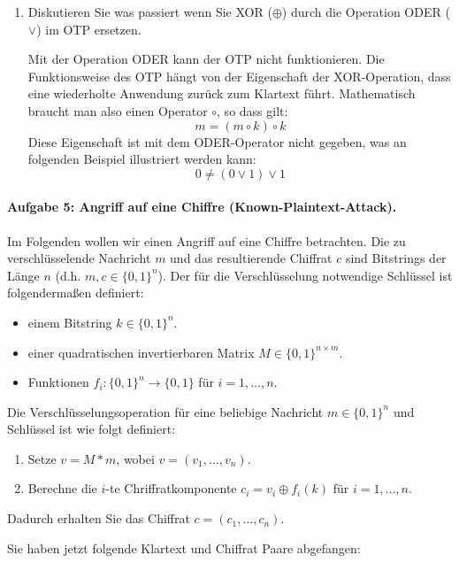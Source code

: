 \documentclass[
  ngerman,
  DIV=12
]{scrartcl}
\begin{document}
\begin{enumerate}[label=\alph*)]

\item Diskutieren Sie was passiert wenn Sie XOR ($\oplus$) durch die Operation ODER ($\vee$) im OTP ersetzen.

Mit der Operation ODER kann der OTP nicht funktionieren. Die Funktionsweise des OTP hängt von der Eigenschaft der XOR-Operation, dass eine wiederholte Anwendung zurück zum Klartext führt. Mathematisch braucht man also einen Operator $\circ$, so dass gilt:
\begin{equation*}
m = (m \circ k) \circ k  
\end{equation*}
Diese Eigenschaft ist mit dem ODER-Operator nicht gegeben, was an folgenden Beispiel illustriert werden kann:
\begin{equation*}
0 \neq (0 \vee 1) \vee 1
\end{equation*}
\end{enumerate}

\paragraph{Aufgabe 5: Angriff auf eine Chiffre (Known-Plaintext-Attack).} Im Folgenden wollen wir einen Angriff auf eine Chiffre betrachten. Die zu verschlüsselende Nachricht $m$ und das resultierende Chiffrat $c$ sind Bitstrings der Länge $n$ (d.h. $m, c \in \{0, 1\}^n$). Der für die Verschlüsselung notwendige Schlüssel ist folgendermaßen definiert:
\begin{itemize}
\item einem Bitstring $k \in \{0, 1\}^n$.
\item einer quadratischen invertierbaren Matrix $M \in \{0, 1\}^{n \times m}$.
\item Funktionen $f_i: \{0, 1\}^n \to \{0, 1\}$ für $i = 1,\dots, n$.
\end{itemize}
Die Verschlüsselungsoperation für eine beliebige Nachricht $m \in \{0, 1\}^n$ und Schlüssel ist wie folgt definiert:
\begin{enumerate}
\item Setze $v = M * m$, wobei $v = (v_1, \dots, v_n)$.
\item Berechne die $i$-te Chriffratkomponente $c_i = v_i \oplus f_i(k)$ für $i = 1, \dots, n$.  
\end{enumerate}
Dadurch erhalten Sie das Chiffrat $c = (c_1, \dots, c_n)$.

Sie haben jetzt folgende Klartext und Chiffrat Paare abgefangen:

\end{document}
